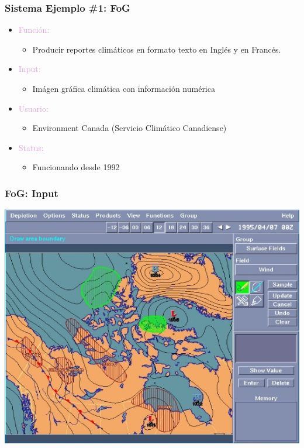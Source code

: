 \documentclass[compress,color=usenames]{beamer}
\newcommand{\mH}[1]{\textcolor{Plum}{#1}}
\begin{document}
\begin{frame}
\frametitle{Sistema Ejemplo \#1: FoG}

\begin{itemize}
\item \mH{Funci\'on: }
\begin{itemize}
\item Producir reportes clim\'aticos en formato texto  en Ingl\'es y en Franc\'es.
\end{itemize}
\item \mH{Input: }
\begin{itemize}
\item Im\'agen gr\'afica clim\'atica con informaci\'on num\'erica
\end{itemize}
\item \mH{Usuario: }
\begin{itemize}
\item Environment Canada (Servicio Clim\'atico Canadiense)
\end{itemize}
\item \mH{Status: }
\begin{itemize}
\item Funcionando desde 1992
\end{itemize}
\end{itemize}
\end{frame}

\begin{frame}
\frametitle{FoG: Input}

\begin{center}
\includegraphics[scale=.4]{pics/pic2.jpg}
\end{center}

\end{frame}
\end{document}
